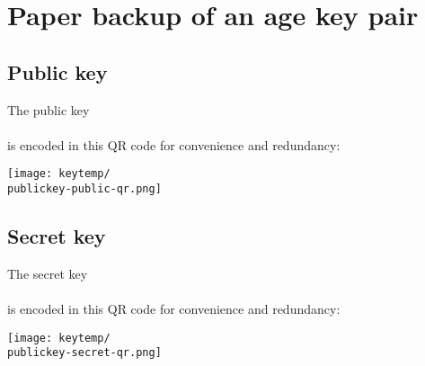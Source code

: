 \documentclass[14pt]{extarticle}
\begin{document}
\section*{Paper backup of an age key pair}

\subsection*{Public key}

The public key \\ \texttt{\publickey} \\ is encoded in this QR code for convenience and redundancy:

\begin{center}
\texttt{[image: keytemp/\\publickey-public-qr.png]}
\end{center}

\subsection*{Secret key}

The secret key \\ \texttt{\secretkey} \\ is encoded in this QR code for convenience and redundancy:

\begin{center}
\texttt{[image: keytemp/\\publickey-secret-qr.png]}
\end{center}
\end{document}
